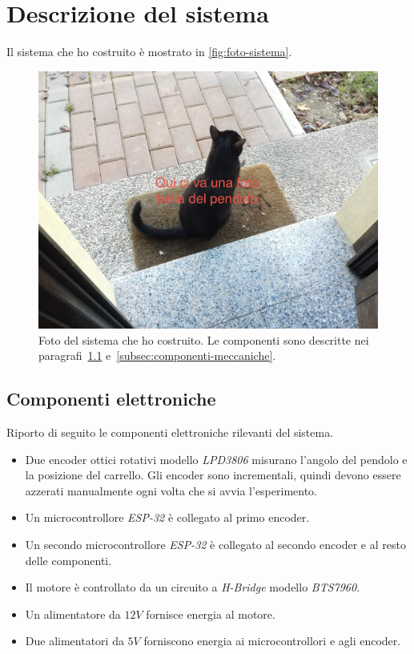 \section{Descrizione del sistema}
\label{sec:sistema-reale}
Il sistema che ho costruito è mostrato in \autoref{fig:foto-sistema}.

\begin{figure}[H]
    \centering
    \includegraphics[width=\textwidth]{assets/foto-pendolo}
    \caption[Foto del sistema]{Foto del sistema che ho costruito.
    Le componenti sono descritte nei
    paragrafi~\ref{subsec:componenti-elettroniche} e~\ref{subsec:componenti-meccaniche}.}
    \label{fig:foto-sistema}
\end{figure}

\subsection{Componenti elettroniche}
\label{subsec:componenti-elettroniche}
Riporto di seguito le componenti elettroniche rilevanti del sistema.
\begin{itemize}
    \item Due encoder ottici rotativi modello \emph{LPD3806} misurano l'angolo
    del pendolo e la posizione del carrello.
    Gli encoder sono incrementali, quindi devono essere azzerati manualmente
    ogni volta che si avvia l'esperimento.

    \item Un microcontrollore \emph{ESP-32} è collegato al primo encoder.

    \item Un secondo microcontrollore \emph{ESP-32} è collegato al
    secondo encoder e al resto delle componenti.

    \item Il motore è controllato da un circuito a \emph{H-Bridge}
    modello \emph{BTS7960}.

    \item Un alimentatore da $12V$ fornisce energia al motore.

    \item Due alimentatori da $5V$ forniscono energia ai microcontrollori
    e agli encoder.
\end{itemize}

